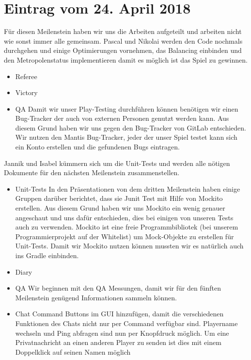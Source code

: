 \documentclass{scrartcl}
\newcommand{\n}{\newline}
\begin{document}
\section*{Eintrag vom 24. April 2018}
Für diesen Meilenstein haben wir uns die Arbeiten aufgeteilt und arbeiten nicht wie sonst immer alle gemeinsam. Pascal und Nikolai werden den Code nochmals durchgehen und einige Optimierungen vornehmen, das Balancing einbinden und den Metropolenstatus implementieren damit es möglich ist das Spiel zu gewinnen. 
\begin{itemize}
	\item Referee
	\item Victory
	\item QA \n
	Damit wir unser Play-Testing durchführen können benötigen wir einen Bug-Tracker der auch von externen Personen genutzt werden kann. Aus diesem Grund haben wir uns gegen den Bug-Tracker von GitLab entschieden. Wir nutzen den Mantis Bug-Tracker, jeder der unser Spiel testet kann sich ein Konto erstellen und die gefundenen Bugs eintragen.
\end{itemize}

Jannik und Isabel kümmern sich um die Unit-Tests und werden alle nötigen Dokumente für den nächsten Meilenstein zusammenstellen.
\begin{itemize}
	\item Unit-Tests \n
	In den Präsentationen von dem dritten Meilenstein haben einige Gruppen darüber berichtet, dass sie Junit Test mit Hilfe von Mockito erstellen. Aus diesem Grund haben wir uns Mockito ein wenig genauer angeschaut und uns dafür entschieden, dies bei einigen von unseren Tests auch zu verwenden. Mockito ist eine freie Programmbibliotek (bei unserem Programmierprojekt auf der Whitelist) um Mock-Objekte zu erstellen für Unit-Tests. Damit wir Mockito nutzen können mussten wir es natürlich auch ins Gradle einbinden. 
	\item Diary
	\item QA \n
	Wir beginnen mit den QA Messungen, damit wir für den fünften Meilenstein genügend Informationen sammeln können.
	\item Chat Command \n
	Buttons im GUI hinzufügen, damit die verschiedenen Funktionen des Chats nicht nur per Command verfügbar sind. Playername wechseln und Ping abfragen sind nun per Knopfdruck möglich. Um eine Privatnachricht an einen anderen Player zu senden ist dies mit einem Doppelklick auf seinen Namen möglich
\end{itemize}
	
	
\end{document}

